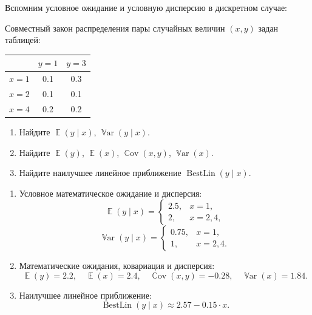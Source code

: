 \documentclass[12pt]{article}
\DeclareMathOperator{\Cov}{\mathbb{C}ov}
\DeclareMathOperator{\Var}{\mathbb{V}ar}
\DeclareMathOperator{\BestLin}{BestLin}
\DeclareMathOperator{\E}{\mathbb{E}}
\begin{document}
Вспомним условное ожидание и условную дисперсию в дискретном случае:
\begin{problem}
Совместный закон распределения пары случайных величин $(x, y)$ задан таблицей:

\begin{tabular}{ccc}
\toprule
     & $y = 1$ & $y = 3$ \\
\midrule
$x = 1$ & 0.1 & 0.3 \\
$x = 2$ & 0.1 & 0.1 \\
$x = 4$ & 0.2 & 0.2 \\
\bottomrule
\end{tabular}

\begin{enumerate}
    \item Найдите $\E(y \mid x)$, $\Var(y \mid x)$.
    \item Найдите $\E(y)$, $\E(x)$, $\Cov(x, y)$, $\Var(x)$.
    \item Найдите наилучшее линейное приближение $\BestLin(y \mid x)$.
\end{enumerate}

    \begin{sol}
    \begin{enumerate}
    \item Условное математическое ожидание и дисперсия:
   \[
   \E(y \mid x) = \begin{cases}
   2.5, & x = 1, \\
   2, & x = 2, 4,
   \end{cases}
   \]
   \[
   \Var(y \mid x) = \begin{cases}
   0.75, & x = 1, \\
   1, & x = 2, 4.
   \end{cases}
   \]
    \item Математические ожидания, ковариация и дисперсия:
   \[
   \E(y) = 2.2, \quad \E(x) = 2.4, \quad \Cov(x, y) = -0.28, \quad \Var(x) = 1.84.
   \]
    \item Наилучшее линейное приближение:
   \[
   \BestLin(y \mid x) \approx 2.57 - 0.15 \cdot x.
   \]
   \end{enumerate}
    \end{sol}
\end{problem}
\end{document}

